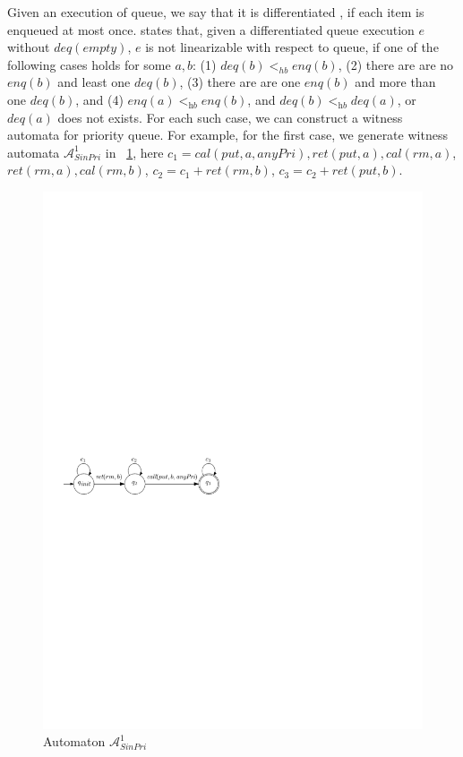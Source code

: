 Given an execution of queue, we say that it is differentiated \cite{Wolper:1986}, if each item is enqueued at most once. \cite{Bouajjani:2015} states that, given a differentiated queue execution $e$ without $\textit{deq}(\textit{empty})$, $e$ is not linearizable with respect to queue, if one of the following cases holds for some $a,b$: (1) $\textit{deq}(b) <_{hb} \textit{enq}(b)$, (2) there are are no $\textit{enq}(b)$ and least one $\textit{deq}(b)$, (3) there are are one $\textit{enq}(b)$ and more than one $\textit{deq}(b)$, and (4) $\textit{enq}(a) <_{\textit{hb}} \textit{enq}(b)$, and $\textit{deq}(b) <_{\textit{hb}} \textit{deq}(a)$, or $\textit{deq}(a)$ does not exists. For each such case, we can construct a witness automata for priority queue. For example, for the first case, we generate witness automata $\mathcal{A}_{\textit{SinPri}}^1$ in \figurename~\ref{fig:automata for FIFO-1}, here $c_1 = \textit{cal}(\textit{put},a,\textit{anyPri}), \textit{ret}(\textit{put},a), \textit{cal}(\textit{rm},a)$, $\textit{ret}(\textit{rm},a),\textit{cal}(\textit{rm},b)$, $c_2 = c_1 + \textit{ret}(\textit{rm},b)$, $c_3 = c_2 + \textit{ret}(\textit{put},b)$.


\begin{figure}[htbp]
  \centering
  \includegraphics[width=0.6 \textwidth]{figures/PIC_AUTO_FIFO_1.pdf}
  \caption{Automaton $\mathcal{A}_{\textit{SinPri}}^1$}
  \label{fig:automata for FIFO-1}
\end{figure}

